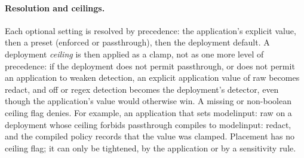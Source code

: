 \documentclass[11pt]{article}
\newcommand{\ubreak}{\textunderscore\allowbreak}
\newcommand{\code}[1]{{\ttfamily\let\_\ubreak #1}}
\begin{document}
\paragraph{Resolution and ceilings.} Each optional setting is resolved by precedence: the
application's explicit value, then a preset (\code{enforced} or \code{passthrough}), then the
deployment default. A deployment \emph{ceiling} is then applied as a clamp, not as one more
level of precedence: if the deployment does not permit passthrough, or does not permit an
application to weaken detection, an explicit application value of \code{raw} becomes
\code{redact}, and \code{off} or \code{regex} detection becomes the deployment's detector, even
though the application's value would otherwise win. A missing or non-boolean ceiling flag
denies. For example, an application that sets \code{model\_input: raw} on a deployment whose
ceiling forbids passthrough compiles to \code{model\_input: redact}, and the compiled policy
records that the value was clamped. Placement has no ceiling flag; it can only be tightened,
by the application or by a sensitivity rule.
\end{document}
